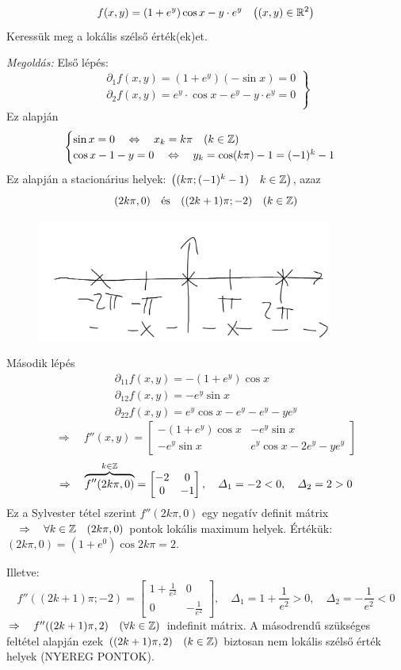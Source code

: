 \documentclass[a4paper,11.5pt]{article}
\begin{document}
	\begin{task}
		\[ f(x,y)=(1+e^y)\cos x-y\cdot e^y\quad \big((x,y)\in\mathbb{R}^2 \big) \]
		Keressük meg a lokális szélső érték(ek)et.
		
		\textit{Megoldás:} Első lépés:
		\[\left.\begin{gathered}
			\partial_1f(x,y)=(1+e^y)(-\sin x)=0\\
			\partial_2f(x,y)=e^y\cdot\cos x-e^y-y\cdot e^y=0\\
		\end{gathered}\right\}  \]
		Ez alapján
		\[\begin{cases}
			\sin x=0\quad \Leftrightarrow\quad x_k=k\pi\quad (k\in\mathbb{Z})\\
			\cos x-1-y=0\quad \Leftrightarrow\quad y_k=\cos(k\pi)-1=(-1)^k-1
		\end{cases}\]
		Ez alapján a stacionárius helyek: $\big((k\pi; (-1)^k-1)\quad k\in\mathbb{Z}\big)$, azaz
		\[ (2k\pi,0)\quad \text{és}\quad ((2k+1)\pi; -2) \quad (k\in\mathbb{Z})\]
		\begin{figure}[H]
			\centering
			\includegraphics[height=4cm]{../2zh/kepek/39.png}
			\caption{}
		\end{figure}
		Második lépés
		\begin{align*}
			\partial_{11}f(x,y)=-(1+e^y)\cos x\\
			\partial_{12}f(x,y)=-e^y\sin x\\
			\partial_{22}f(x,y)=e^y\cos x-e^y-e^y-ye^y
		\end{align*}
		\[ \Rightarrow\quad f''(x,y)=\begin{bmatrix}
			-(1+e^y)\cos x&-e^y\sin x\\
			-e^y\sin x&e^y\cos x-2e^y-ye^y
		\end{bmatrix}\]
		\[ \Rightarrow\quad \overbrace{f''(2k\pi,0)}^{k\in\mathbb{Z}}=\begin{bmatrix}
			-2&0\\
			0&-1
		\end{bmatrix},\quad \varDelta_1=-2<0, \quad \varDelta_2=2>0 \]
		Ez a Sylvester tétel szerint $f''(2k\pi,0)$ egy negatív definit mátrix$\quad \Rightarrow\quad \forall k\in\mathbb{Z} \quad (2k\pi,0)$ pontok lokális maximum helyek. Értékük: $(2k\pi,0)=(1+e^0)\cos2k\pi=2$.
		
		Illetve:
		\[f''((2k+1)\pi;-2)=\begin{bmatrix}
			1+\frac{1}{e^2}&0\\
			0&-\frac{1}{e^2}
		\end{bmatrix},\quad \varDelta_1=1+\frac{1}{e^2}>0,\quad \varDelta_2=-\frac{1}{e^2}<0 \]
		$\Rightarrow\quad f''((2k+1)\pi,2)\quad (\forall k\in\mathbb{Z})$ indefinit mátrix. A másodrendű szükséges feltétel alapján ezek $((2k+1)\pi,2)\quad (k\in\mathbb{Z})$ biztosan nem lokális szélső érték helyek (NYEREG PONTOK).
	\end{task}
\end{document}
